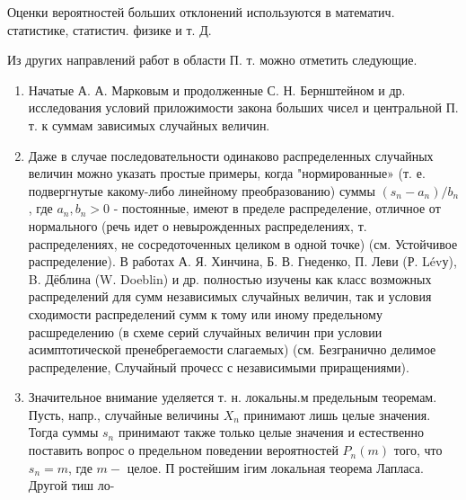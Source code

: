 \documentclass[10pt]{article}
\begin{document}
Оценки вероятностей больших отклонений используются в математич. статистике, статистич. физике и т. Д.



Из других направлений работ в области П. т. можно отметить следующие.



\begin{enumerate}

  \item Начатые А. А. Марковым и продолженные С. Н. Бернштейном и др. исследования условий приложимости закона больших чисел и центральной П. т. к суммам зависимых случайных величин.



  \item Даже в случае последовательности одинаково распределенных случайных величин можно указать простые примеры, когда "нормированные» (т. е. подвергнутые какому-либо линейному преобразованию) суммы $\left(s_{n}-a_{n}\right) / b_{n}$, где $a_{n}, b_{n}>0$ - постоянные, имеют в пределе распределение, отличное от нормального (речь идет о невырожденных распределениях, т. распределениях, не сосредоточенных целиком в одной точке) (см. Устойчивое распределение). В работах А. Я. Хинчина, Б. В. Гнеденко, П. Леви (Р. Lévу), B. Дёблина (W. Doeblin) и др. полностью изучены как класс возможных распределений для сумм независимых случайных величин, так и условия сходимости распределений сумм к тому или иному предельному расшределению (в схеме серий случайных величин при условии асимптотической пренебрегаемости слагаемых) (см. Безгранично делимое распределение, Случайный прочесс с независимыми приращениями).



  \item Значительное внимание уделяется т. н. локальны.м предельным теоремам. Пусть, напр., случайные величины $X_{n}$ принимают лишь целые значения. Тогда суммы $s_{n}$ принимают также только целые значения и естественно поставить вопрос о предельном поведении вероятностей $P_{n}(m)$ того, что $s_{n}=m$, где $m-$ целое. П ростейшим ігим локальная теорема Лапласа. Другой тиш ло-



\end{enumerate}
\end{document}
